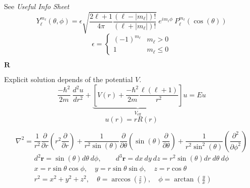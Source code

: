 
See \textit{Useful Info Sheet}
\begin{equation*}
    Y_{\ell}^{m_\ell}(\theta, \phi) = \epsilon\sqrt{\frac{2\ell+1}{4\pi}\frac{(\ell-|m_\ell|)!}{(\ell+|m_\ell|)!}}\:e^{im_\ell\phi}\:P_{\ell}^{m_\ell}(\cos(\theta))
\end{equation*}
\begin{equation*}
    \epsilon = \begin{cases}
        {(-1)}^{m_\ell} & m_\ell > 0    \\
        1               & m_\ell \leq 0
    \end{cases}
\end{equation*}

\newpar{}
 $\mathbf{R}$

Explicit solution depends of the potential $V$.
\begin{equation*}
    \frac{-\hbar^2}{2m}\:\frac{d^2u}{dr^2}+\underbrace{\left[V(r)+\frac{-\hbar^2}{2m}\frac{\ell(\ell+1)}{r^2}\right]}_{V_{\text{eff}}}u = Eu
\end{equation*}
\begin{equation*}
    u(r) = rR(r)
\end{equation*}

{\footnotesize
    \begin{equation*}
        \nabla^2  =\frac{1}{r^2}\frac{\partial}{\partial r}\left(r^2\frac{\partial}{\partial r}\right) + \frac{1}{r^2\sin(\theta)}\frac{\partial}{\partial\theta}\left(\sin(\theta)\frac{\partial}{\partial \theta}\right)
        + \frac{1}{r^2\sin^2(\theta)}\left(\frac{\partial^2}{\partial \phi^2}\right)
    \end{equation*}}
\begin{gather*}
    d^2\mathbf{r} = \sin(\theta)d\theta\:d\phi, \qquad d^3\mathbf{r} = dx\:dy\:dz = r^2\sin(\theta)dr\:d\theta\:d\phi\\
    x = r\sin\theta\cos\phi,\quad y = r\sin\theta\sin\phi,\quad z=r\cos\theta\\
    r^2=x^2+y^2+z^2, \quad \theta=\arccos\left(\frac{z}{r}\right) , \quad \phi=\arctan\left(\frac{y}{x}\right)
\end{gather*}

